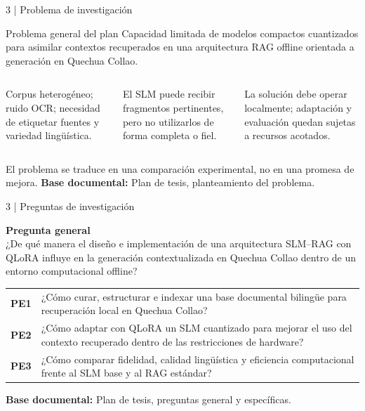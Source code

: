 \documentclass[aspectratio=169,10pt,spanish]{beamer}
\newcommand{\fuente}[1]{\vfill{\tiny\color{bpNavy!75}\textbf{Base documental:} #1}}
\begin{document}
\begin{frame}{3 | Problema de investigación}
\begin{block}{Problema general del plan}
\small Capacidad limitada de modelos compactos cuantizados para asimilar contextos recuperados en una arquitectura RAG offline orientada a generación en Quechua Collao.
\end{block}
\vspace{0.12cm}
\begin{columns}[T,onlytextwidth]
\begin{tcolorbox}[colback=bpLightGray,colframe=bpRust,title={Datos y recuperación}]
Corpus heterogéneo; ruido OCR; necesidad de etiquetar fuentes y variedad lingüística.
\end{tcolorbox}
\begin{tcolorbox}[colback=bpLightGray,colframe=bpBlue,title={Uso del contexto}]
El SLM puede recibir fragmentos pertinentes, pero no utilizarlos de forma completa o fiel.
\end{tcolorbox}
\begin{tcolorbox}[colback=bpLightGray,colframe=bpGold,title={Restricción de cómputo}]
La solución debe operar localmente; adaptación y evaluación quedan sujetas a recursos acotados.
\end{tcolorbox}
\end{columns}
\vspace{0.16cm}
\centering\scriptsize El problema se traduce en una comparación experimental, no en una promesa de mejora.
\fuente{Plan de tesis, planteamiento del problema.}
\end{frame}

\begin{frame}{3 | Preguntas de investigación}
\small
\begin{tcolorbox}[colback=bpNavy,colframe=bpNavy]
\color{white}\textbf{Pregunta general}\\
¿De qué manera el diseño e implementación de una arquitectura SLM--RAG con QLoRA influye en la generación contextualizada en Quechua Collao dentro de un entorno computacional offline?
\end{tcolorbox}
\vspace{0.12cm}
\begin{tabularx}{\textwidth}{>{\bfseries}p{1.2cm} X}
\toprule
PE1 & ¿Cómo curar, estructurar e indexar una base documental bilingüe para recuperación local en Quechua Collao?\\
PE2 & ¿Cómo adaptar con QLoRA un SLM cuantizado para mejorar el uso del contexto recuperado dentro de las restricciones de hardware?\\
PE3 & ¿Cómo comparar fidelidad, calidad lingüística y eficiencia computacional frente al SLM base y al RAG estándar?\\
\bottomrule
\end{tabularx}
\fuente{Plan de tesis, preguntas general y específicas.}
\end{frame}
\end{document}
